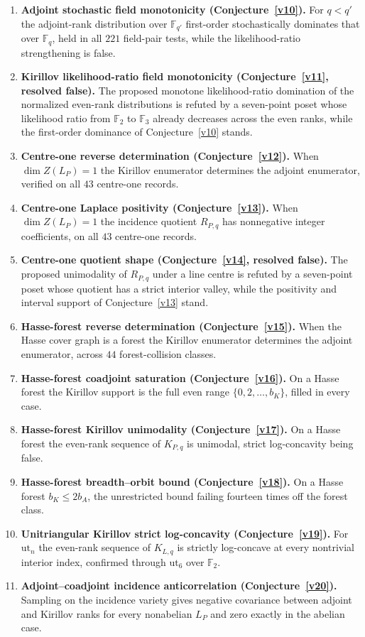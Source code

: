 \documentclass[11pt]{article}
\theoremstyle{definition}
\newcommand{\Fq}{\mathbb F}
\begin{document}
\begin{enumerate}
\item \textbf{Adjoint stochastic field monotonicity (Conjecture~\ref{v10}).}  For $q<q'$ the adjoint-rank distribution over $\Fq_{q'}$ first-order stochastically dominates that over $\Fq_q$, held in all $221$ field-pair tests, while the likelihood-ratio strengthening is false.
\item \textbf{Kirillov likelihood-ratio field monotonicity (Conjecture~\ref{v11}, resolved false).}  The proposed monotone likelihood-ratio domination of the normalized even-rank distributions is refuted by a seven-point poset whose likelihood ratio from $\Fq_2$ to $\Fq_3$ already decreases across the even ranks, while the first-order dominance of Conjecture~\ref{v10} stands.
\item \textbf{Centre-one reverse determination (Conjecture~\ref{v12}).}  When $\dim Z(L_P)=1$ the Kirillov enumerator determines the adjoint enumerator, verified on all $43$ centre-one records.
\item \textbf{Centre-one Laplace positivity (Conjecture~\ref{v13}).}  When $\dim Z(L_P)=1$ the incidence quotient $R_{P,q}$ has nonnegative integer coefficients, on all $43$ centre-one records.
\item \textbf{Centre-one quotient shape (Conjecture~\ref{v14}, resolved false).}  The proposed unimodality of $R_{P,q}$ under a line centre is refuted by a seven-point poset whose quotient has a strict interior valley, while the positivity and interval support of Conjecture~\ref{v13} stand.
\item \textbf{Hasse-forest reverse determination (Conjecture~\ref{v15}).}  When the Hasse cover graph is a forest the Kirillov enumerator determines the adjoint enumerator, across $44$ forest-collision classes.
\item \textbf{Hasse-forest coadjoint saturation (Conjecture~\ref{v16}).}  On a Hasse forest the Kirillov support is the full even range $\{0,2,\ldots,b_K\}$, filled in every case.
\item \textbf{Hasse-forest Kirillov unimodality (Conjecture~\ref{v17}).}  On a Hasse forest the even-rank sequence of $K_{P,q}$ is unimodal, strict log-concavity being false.
\item \textbf{Hasse-forest breadth--orbit bound (Conjecture~\ref{v18}).}  On a Hasse forest $b_K\le 2b_A$, the unrestricted bound failing fourteen times off the forest class.
\item \textbf{Unitriangular Kirillov strict log-concavity (Conjecture~\ref{v19}).}  For $\mathrm{ut}_n$ the even-rank sequence of $K_{L,q}$ is strictly log-concave at every nontrivial interior index, confirmed through $\mathrm{ut}_6$ over $\Fq_2$.
\item \textbf{Adjoint--coadjoint incidence anticorrelation (Conjecture~\ref{v20}).}  Sampling on the incidence variety gives negative covariance between adjoint and Kirillov ranks for every nonabelian $L_P$ and zero exactly in the abelian case.
\end{enumerate}
\end{document}
